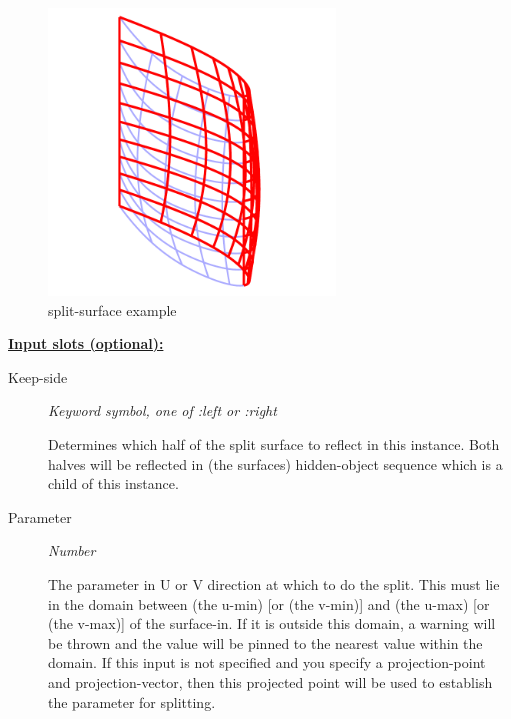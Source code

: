 \documentclass [11pt]{book}
\begin{document}
\begin{itemize}
\begin{figure}
\begin{center}
\includegraphics[width=3in,height=3in]{../images/example-split-surface.pdf}
\end{center}

\caption{split-surface example}

\label{fig:split-surface}

\end{figure}





\textbf{
\underline{Input slots (optional):}}

\begin{description}

\item [Keep-side]
\emph{Keyword symbol, one of :left or :right}

 Determines which half of the split
surface to reflect in this instance. Both halves will be reflected in (the surfaces)
hidden-object sequence which is a child of this instance.




\item [Parameter]
\emph{Number}

 The parameter in U or V direction at which to do the split. This must
lie in the domain between (the u-min) [or (the v-min)] and (the u-max) [or (the v-max)]
of the surface-in. If it is outside this domain, a warning will be thrown and the
value will be pinned to the nearest value within the domain.
If this input is not specified and you specify a projection-point and projection-vector,
then this projected point will be used to establish the parameter for splitting.





\end{description}
\end{itemize}
\end{document}
